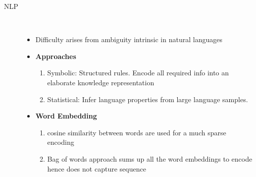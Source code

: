 \documentclass[a4paper, 10pt,landscape]{article}
\begin{document}
\begin{multicols*}{3}
\begin{description}
\begin{itemize}
			\end{itemize}
		\item[NLP]~
			\begin{itemize}
				\item Difficulty arises from ambiguity intrinsic in natural languages
				\item {\bf Approaches}
					\begin{enumerate}
						\item Symbolic: Structured rules. Encode all required info into an elaborate knowledge representation
						\item Statistical: Infer language properties from large language samples.
					\end{enumerate}
				\item {\bf Word Embedding}
					\begin{enumerate}
						\item cosine similarity between words are used for a much sparse encoding
						\item Bag of words approach sums up all the word embeddings to encode hence does not capture sequence
					\end{enumerate}
			\end{itemize}
					
\end{description}


\end{multicols*}
\end{document}
